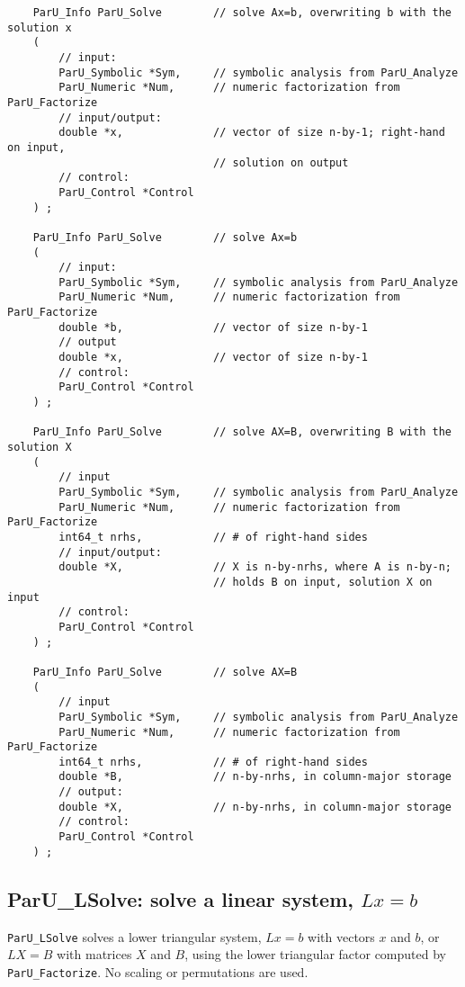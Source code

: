 \documentclass[12pt]{article}
\begin{document}
    {\footnotesize
    \begin{verbatim}
    ParU_Info ParU_Solve        // solve Ax=b, overwriting b with the solution x
    (
        // input:
        ParU_Symbolic *Sym,     // symbolic analysis from ParU_Analyze
        ParU_Numeric *Num,      // numeric factorization from ParU_Factorize
        // input/output:
        double *x,              // vector of size n-by-1; right-hand on input,
                                // solution on output
        // control:
        ParU_Control *Control
    ) ;

    ParU_Info ParU_Solve        // solve Ax=b
    (
        // input:
        ParU_Symbolic *Sym,     // symbolic analysis from ParU_Analyze
        ParU_Numeric *Num,      // numeric factorization from ParU_Factorize
        double *b,              // vector of size n-by-1
        // output
        double *x,              // vector of size n-by-1
        // control:
        ParU_Control *Control
    ) ;

    ParU_Info ParU_Solve        // solve AX=B, overwriting B with the solution X
    (
        // input
        ParU_Symbolic *Sym,     // symbolic analysis from ParU_Analyze
        ParU_Numeric *Num,      // numeric factorization from ParU_Factorize
        int64_t nrhs,           // # of right-hand sides
        // input/output:
        double *X,              // X is n-by-nrhs, where A is n-by-n;
                                // holds B on input, solution X on input
        // control:
        ParU_Control *Control
    ) ;

    ParU_Info ParU_Solve        // solve AX=B
    (
        // input
        ParU_Symbolic *Sym,     // symbolic analysis from ParU_Analyze
        ParU_Numeric *Num,      // numeric factorization from ParU_Factorize
        int64_t nrhs,           // # of right-hand sides
        double *B,              // n-by-nrhs, in column-major storage
        // output:
        double *X,              // n-by-nrhs, in column-major storage
        // control:
        ParU_Control *Control
    ) ; \end{verbatim} }

\subsection{{\sf ParU\_LSolve}: solve a linear system, $Lx=b$}

    \verb'ParU_LSolve' solves a lower triangular system, $Lx=b$ with vectors
    $x$ and $b$, or $LX=B$ with matrices $X$ and $B$, using the lower
    triangular factor computed by \verb'ParU_Factorize'.  No scaling or
    permutations are used.
\end{document}
